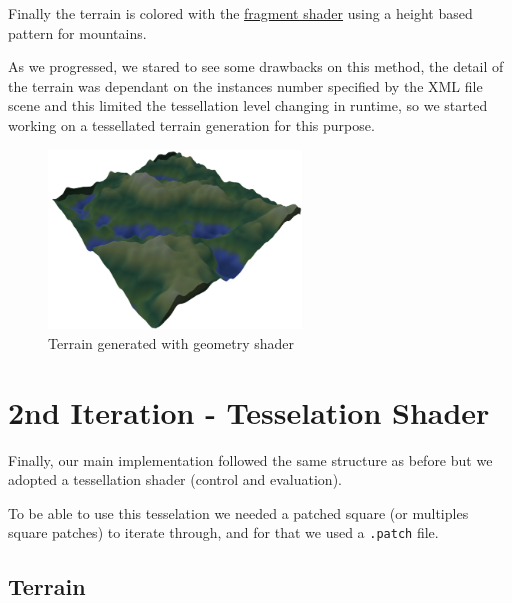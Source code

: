 \documentclass[a4paper]{report}
\begin{document}
Finally the terrain is colored with the \underline{fragment shader} using a height based pattern for mountains.
\newline

As we progressed, we stared to see some drawbacks on this method, the detail of the terrain was dependant on
the instances number specified by the XML file scene and this limited the tessellation level changing in
runtime, so we started working on a tessellated terrain generation for this purpose.


\begin{figure}[H]
  \centering
  \includegraphics[width=0.6\textwidth]{images/fst_it.png}
  \caption{Terrain generated with geometry shader}
\end{figure}

\chapter{2nd Iteration - Tesselation Shader}



Finally, our main implementation followed the same structure as before but we adopted a tessellation
shader (control and evaluation).

To be able to use this tesselation we needed a patched square (or multiples square patches) to
iterate through, and for that we used a \texttt{.patch} file.



\section{Terrain}
\end{document}
